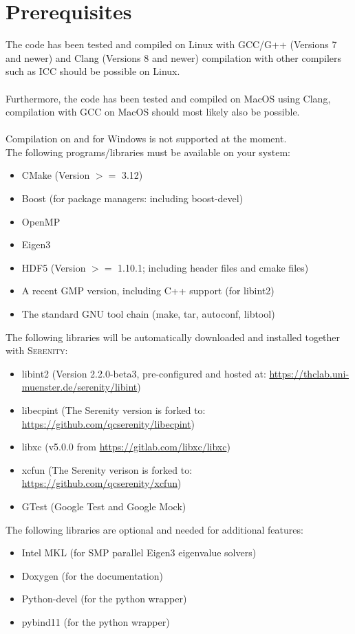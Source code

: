 \documentclass[bibliography=totocnumbered,a4paper,10pt,oneside]{scrbook}
\newcommand{
\serenity}{\textsc{Serenity}\xspace}
\begin{document}
\section{Prerequisites}
The code has been tested and compiled on Linux with GCC/G++
(Versions 7 and newer) and Clang (Versions 8 and newer)
compilation with other compilers such as ICC should be
possible on Linux.\\
\\
Furthermore, the code has been tested and
compiled on MacOS using Clang, compilation with GCC on MacOS
should most likely also be possible.\\
\\
Compilation on and for Windows is not supported at the moment.
\\
The following programs/libraries must be available on your system:
\begin{itemize}
 \item CMake (Version $>=$ 3.12)
 \item Boost (for package managers: including boost-devel)
 \item OpenMP
 \item Eigen3
 \item HDF5 (Version $>=$ 1.10.1; including header files and cmake files)
 \item A recent GMP version, including C++ support (for libint2)
 \item The standard GNU tool chain (make, tar, autoconf, libtool)
\end{itemize}
The following libraries will be automatically downloaded and installed together
with \serenity:
\begin{itemize}
 \item libint2 (Version 2.2.0-beta3, pre-configured and hosted at: \url{https://thclab.uni-muenster.de/serenity/libint})
 \item libecpint (The Serenity version is forked to: \url{https://github.com/qcserenity/libecpint})
 \item libxc (v5.0.0 from \url{https://gitlab.com/libxc/libxc})
 \item xcfun (The Serenity verison is forked to: \url{https://github.com/qcserenity/xcfun})
 \item GTest (Google Test and Google Mock)
\end{itemize}
The following libraries are optional and needed for additional features:
\begin{itemize}
 \item Intel MKL (for SMP parallel Eigen3 eigenvalue solvers)
 \item Doxygen (for the documentation)
 \item Python-devel (for the python wrapper)
 \item pybind11 (for the python wrapper)
\end{itemize}
\end{document}
